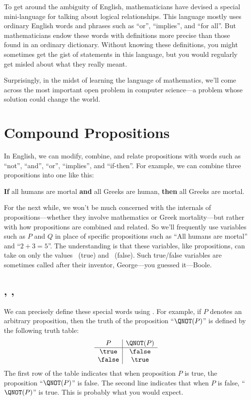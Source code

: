 To get around the ambiguity of English, mathematicians have devised a
special mini-language for talking about logical relationships.  This
language mostly uses ordinary English words and phrases such as ``or'',
``implies'', and ``for all''.  But mathematicians endow these words with
definitions more precise than those found in an ordinary dictionary.
Without knowing these definitions, you might sometimes get the gist of
statements in this language, but you would regularly get misled about what
they really meant.

Surprisingly, in the midst of learning the language of mathematics, we'll
come across the most important open problem in computer science---a
problem whose solution could change the world.

\section{Compound Propositions}

In English, we can modify, combine, and relate propositions with words
such as ``not'', ``and'', ``or'', ``implies'', and ``if-then''.
For example, we can combine three propositions into one like this:
%
\begin{center}
\textbf{If} all humans are mortal \textbf{and} all Greeks are human,
\textbf{then} all Greeks are mortal.
\end{center}

For the next while, we won't be much concerned with the internals of
propositions---whether they involve mathematics or Greek mortality---but
rather with how propositions are combined and related.  So we'll
frequently use variables such as $P$ and $Q$ in place of specific
propositions such as ``All humans are mortal'' and ``$2 + 3 = 5$''.  The
understanding is that these variables, like propositions, can take on only
the values \true ~(true) and \false ~(false).  Such true/false variables are
sometimes called  after their inventor,
George---you guessed it---Boole. 

\subsection{\QNOT, \QAND, \QOR}

We can precisely define these special words using .
For example, if $P$ denotes an arbitrary proposition, then the
truth of the proposition ``$\QNOT(P)$'' is defined by the following
truth table:
%
\[
\begin{array}{c|c}
P & \QNOT(P) \\ \hline
\true & \false \\
\false & \true \\
\end{array}
\]
%
The first row of the table indicates that when proposition $P$ is true,
the proposition ``$\QNOT(P)$'' is false.  The second line indicates that
when $P$ is false, ``$\QNOT(P)$'' is true.  This is probably what you would
expect.

